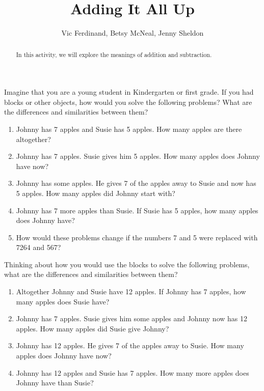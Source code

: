 \documentclass[nooutcomes]{ximera}
\title{Adding It All Up}
\author{Vic Ferdinand, Betsy McNeal, Jenny Sheldon}
\begin{document}
\begin{abstract} In this activity, we will explore the meanings of addition and subtraction. \end{abstract}
\maketitle



\begin{problem}
Imagine that you are a young student in Kindergarten or first grade.  If you had blocks or other objects, how would you solve the following problems?  What are the differences and similarities between them?
\begin{enumerate}
\item Johnny has 7 apples and Susie has 5 apples.  How many apples are there altogether?
\item Johnny has 7 apples.  Susie gives him 5 apples.  How many apples does Johnny have now?
\item Johnny has some apples.  He gives 7 of the apples away to Susie and now has 5 apples.  How many apples did Johnny start with?
\item Johnny has 7 more apples than Susie.  If Susie has 5 apples, how many apples does Johnny have?
\item How would these problems change if the numbers 7 and 5 were replaced with 7264 and 567?
\end{enumerate}
\end{problem}

\begin{problem}
 Thinking about how you would use the blocks to solve the following problems, what are the differences and similarities between them?
\begin{enumerate}
\item Altogether Johnny and Susie have 12 apples.  If Johnny has 7 apples, how many apples does Susie have?
\item Johnny has 7 apples.  Susie gives him some apples and Johnny now has 12 apples.  How many apples did Susie give Johnny?
\item Johnny has 12 apples.  He gives 7 of the apples away to Susie.  How many apples does Johnny have now?
\item Johnny has 12 apples and Susie has 7 apples.  How many more apples does Johnny have than Susie?
\end{enumerate}
\end{problem}
\end{document}
